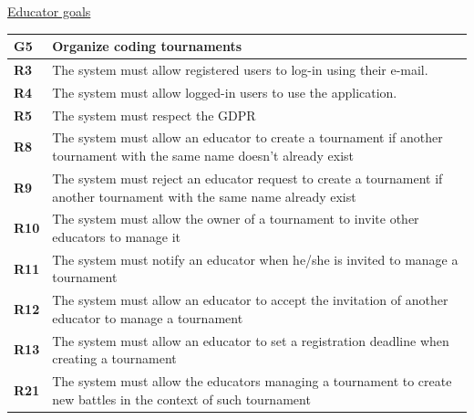 \documentclass[../RASD.tex]{subfiles}
\begin{document}
        \underline{Educator goals}
        \begin{table}[h!]
            \begin{center}
                \begin{tabular}{|m{2em}|m{30em}|}
                \hline
                \rowcolor{ReqMappingRow1}
                \textbf{G5} & \textbf{Organize coding tournaments}\\
                \hline
                \cellcolor{ReqMappingCell2}
                \textbf{R3} & The system must allow registered users to log-in using their e-mail.\\
                \hline
                \cellcolor{ReqMappingCell2}
                \textbf{R4} & The system must allow logged-in users to use the application.\\
                \hline
                \cellcolor{ReqMappingCell2}
                \textbf{R5} & The system must respect the GDPR\\
                \hline
                \cellcolor{ReqMappingCell2}
                \textbf{R8} & The system must allow an educator to create a tournament if another tournament with the same name doesn't already exist\\
                \hline
                \cellcolor{ReqMappingCell2}
                \textbf{R9} & The system must reject an educator request to create a tournament if another tournament with the same name already exist\\
                \hline
                \cellcolor{ReqMappingCell2}
                \textbf{R10} & The system must allow the owner of a tournament to invite other educators to manage it\\
                \hline
                \cellcolor{ReqMappingCell2}
                \textbf{R11} & The system must notify an educator when he/she is invited to manage a tournament\\
                \hline
                \cellcolor{ReqMappingCell2}
                \textbf{R12} & The system must allow an educator to accept the invitation of another educator to manage a tournament\\
                \hline
                \cellcolor{ReqMappingCell2}
                \textbf{R13} & The system must allow an educator to set a registration deadline when creating a tournament\\
                \hline
                \cellcolor{ReqMappingCell2}
                \textbf{R21} & The system must allow the educators managing a tournament to create new battles in the context of such tournament\\

\end{tabular}
\end{center}
\end{table}
\end{document}
